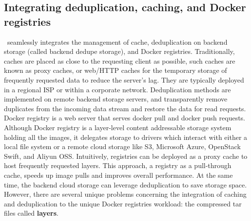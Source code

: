 \subsection{Integrating deduplication, caching, and Docker registries}
\label{sec:design}

%

%
%
%

\sysname~seamlessly integrates the management of cache, deduplication on backend storage (called backend dedupe storage), and Docker registries.
Traditionally, caches are placed as close to the requesting client as possible, 
such caches are known as proxy caches, or web/HTTP caches for the temporary storage of 
frequently requested data to reduce the server's lag. 
They are typically deployed in a regional ISP or within a corporate network.
Deduplication methods are implemented on remote backend storage servers, and
transparently remove duplicates from the incoming data stream and restore the data for read requests. 
Docker registry is a web server that serves docker pull and docker push requests.
Although Docker registry is a layer-level content addressable storage system holding all the images,
it delegates storage to drivers which interact with either a local file system or a remote cloud storage like S3, Microsoft Azure, OpenStack Swift, and Aliyun OSS.
Intuitively, registries can be deployed as a proxy cache to host frequently requested layers. 
This approach, a registry as a pull-through cache, speeds up image pulls and improves overall performance.
At the same time, the backend cloud storage can leverage deduplication to save storage space.
However, there are several unique problems concerning the integration of caching and deduplication to the unique Docker registries workload: the compressed tar files called \textbf{layers}. 

